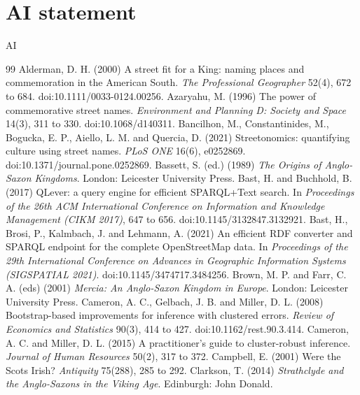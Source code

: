 \documentclass[11pt,a4paper]{article}
\begin{document}
\section*{AI statement}
{{AI}}

\begin{thebibliography}{99}
 Alderman, D. H. (2000) A street fit for a King: naming places and commemoration in the American South. \textit{The Professional Geographer} 52(4), 672 to 684. doi:10.1111/0033-0124.00256.
 Azaryahu, M. (1996) The power of commemorative street names. \textit{Environment and Planning D: Society and Space} 14(3), 311 to 330. doi:10.1068/d140311.
 Bancilhon, M., Constantinides, M., Bogucka, E. P., Aiello, L. M. and Quercia, D. (2021) Streetonomics: quantifying culture using street names. \textit{PLoS ONE} 16(6), e0252869. doi:10.1371/journal.pone.0252869.
 Bassett, S. (ed.) (1989) \textit{The Origins of Anglo-Saxon Kingdoms}. London: Leicester University Press.
 Bast, H. and Buchhold, B. (2017) QLever: a query engine for efficient SPARQL+Text search. In \textit{Proceedings of the 26th ACM International Conference on Information and Knowledge Management (CIKM 2017)}, 647 to 656. doi:10.1145/3132847.3132921.
 Bast, H., Brosi, P., Kalmbach, J. and Lehmann, A. (2021) An efficient RDF converter and SPARQL endpoint for the complete OpenStreetMap data. In \textit{Proceedings of the 29th International Conference on Advances in Geographic Information Systems (SIGSPATIAL 2021)}. doi:10.1145/3474717.3484256.
 Brown, M. P. and Farr, C. A. (eds) (2001) \textit{Mercia: An Anglo-Saxon Kingdom in Europe}. London: Leicester University Press.
 Cameron, A. C., Gelbach, J. B. and Miller, D. L. (2008) Bootstrap-based improvements for inference with clustered errors. \textit{Review of Economics and Statistics} 90(3), 414 to 427. doi:10.1162/rest.90.3.414.
 Cameron, A. C. and Miller, D. L. (2015) A practitioner's guide to cluster-robust inference. \textit{Journal of Human Resources} 50(2), 317 to 372.
 Campbell, E. (2001) Were the Scots Irish? \textit{Antiquity} 75(288), 285 to 292.
 Clarkson, T. (2014) \textit{Strathclyde and the Anglo-Saxons in the Viking Age}. Edinburgh: John Donald.

\end{thebibliography}
\end{document}
